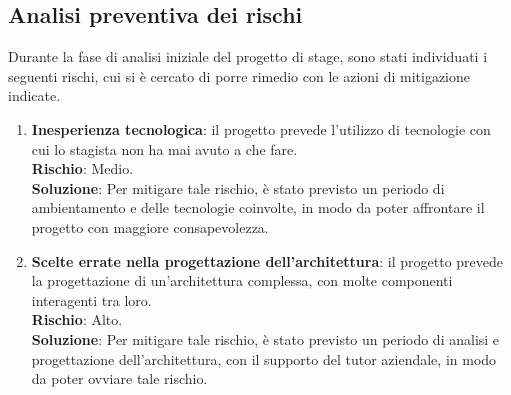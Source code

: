 \subsection{Analisi preventiva dei rischi}
Durante la fase di analisi iniziale del progetto di stage, sono stati individuati i seguenti rischi, cui si è cercato di porre rimedio con le azioni di mitigazione indicate. \\
\begin{enumerate}
    \item \textbf{Inesperienza tecnologica}: il progetto prevede l'utilizzo di tecnologie con cui lo stagista non ha mai avuto a che fare. \\
    \textbf{Rischio}: Medio.\\
    \textbf{Soluzione}: Per mitigare tale rischio, è stato previsto un periodo di ambientamento e delle tecnologie coinvolte, in modo da poter affrontare il progetto con maggiore consapevolezza.
    \item \textbf{Scelte errate nella progettazione dell'architettura}: il progetto prevede la progettazione di un'architettura complessa, con molte componenti interagenti tra loro. \\
    \textbf{Rischio}: Alto.\\
    \textbf{Soluzione}: Per mitigare tale rischio, è stato previsto un periodo di analisi e progettazione dell'architettura, con il supporto del tutor aziendale, in modo da poter ovviare tale rischio.

\end{enumerate}    
\newpage
\pagestyle{empty}
\null %

\newpage